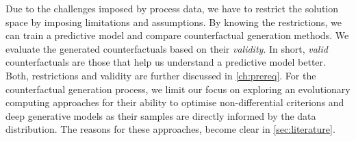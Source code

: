 \documentclass[./../../paper.tex]{subfiles}
\begin{document}
Due to the challenges imposed by process data, we have to restrict the solution space by imposing limitations and assumptions. 
By knowing the restrictions, we can train a predictive model and compare counterfactual generation methods. 
We evaluate the generated counterfactuals based on their \emph{validity}. In short, \emph{valid} counterfactuals are those that help us understand a predictive model better.
Both, restrictions and validity are further discussed in \autoref{ch:prereq}. 
For the counterfactual generation process, we limit our focus on exploring an evolutionary computing approaches for their ability to optimise non-differential criterions and deep generative models as their samples are directly informed by the data distribution. 
The reasons for these approaches, become clear in \autoref{sec:literature}.    
\end{document}
